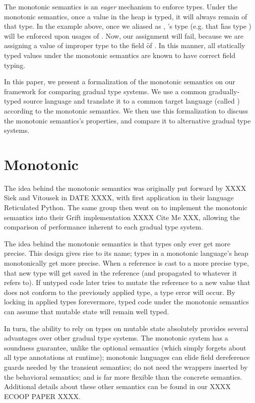 \documentclass[sigconf]{acmart}
\begin{document}
The monotonic semantics is an \emph{eager} mechanism to enforce types. Under
the monotonic semantics, once a value in the heap is typed, it will always
remain of that type. In the example above, once we aliased \x as \xp, \xp's
type (e.g. that \f has type ) will be enforced upon usages of \x. Now,
our assignment  will fail, because we are assigning a
value of improper type to the field \f of \a. In this manner, all statically
typed values under the monotonic semantics are known to have correct field
typing.

In this paper, we present a formalization of the monotonic semantics on our
framework for comparing gradual type systems. We use a common gradually-typed
source language and translate it to a common target language (called \kafka)
according to the monotonic semantics. We then use this formalization to
discuss the monotonic semantics's properties, and compare it to alternative
gradual type systems.

\section{Monotonic}

The idea behind the monotonic semantics was originally put forward by XXXX
Siek and Vitousek in DATE XXXX, with first application in their language
Reticulated Python. The same group then went on to implement the monotonic
semantics into their Grift implementation XXXX Cite Me XXX, allowing the
comparison of performance inherent to each gradual type system.

The idea behind the monotonic semantics is that types only ever get more
precise. This design gives rise to its name; types in a monotonic language's
heap monotonically get more precise. When a reference is cast to a more
precise type, that new type will get saved in the reference (and propagated to
whatever it refers to). If untyped code later tries to mutate the reference to
a new value that does not conform to the previously applied type, a type error
will occur. By locking in applied types forevermore, typed code under the
monotonic semantics can assume that mutable state will remain well typed.

In turn, the ability to rely on types on mutable state absolutely provides
several advantages over other gradual type systems. The monotonic system has
a soundness guarantee, unlike the optional semantics (which simply forgets
about all type annotations at runtime); monotonic languages can elide field
dereference guards needed by the transient semantics; do not need the wrappers
inserted by the behavioral semantics; and is far more flexible than the 
concrete semantics. Additional details about these other semantics can be found
in our XXXX ECOOP PAPER XXXX.
\end{document}
